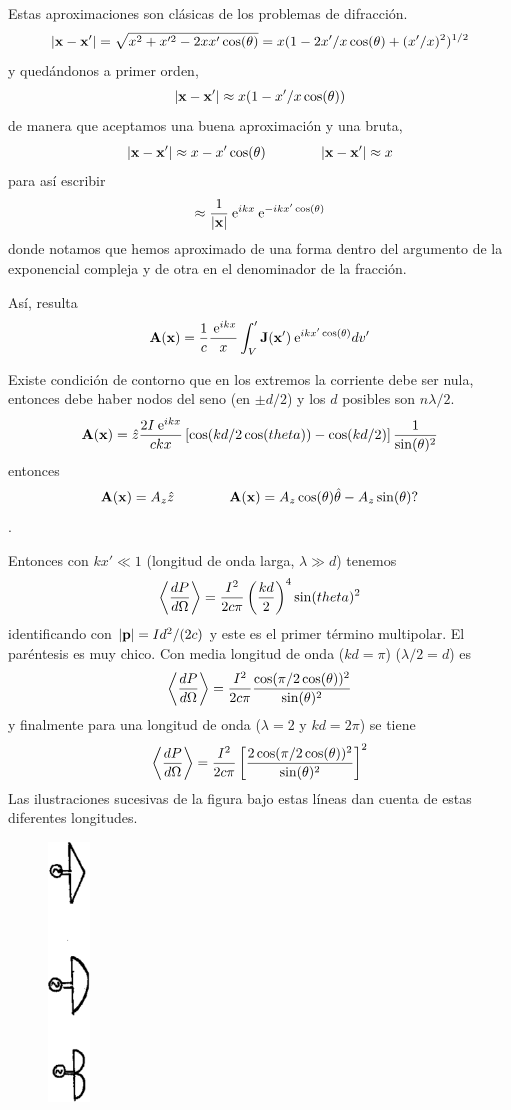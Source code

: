 \documentclass[10pt,oneside]{CBFT_book}
\begin{document}
Estas aproximaciones son clásicas de los problemas de difracción.
\[
	|\vb{x}-\vb{x}'| = \sqrt{ x^2 + x'^2 - 2xx'\cos(\theta)} =  
	x( 1 - 2x'/x \cos(\theta) + (x'/x)^2)^{1/2} 
\]
y quedándonos a primer orden,
\[
	|\vb{x}-\vb{x}'|\approx x (1 - x'/x \cos(\theta))
\]
de manera que aceptamos una buena aproximación y una bruta,
\[
	|\vb{x}-\vb{x}'| \approx x - x' \cos( \theta ) \qquad \qquad |\vb{x}-\vb{x}'| \approx x
\]
para así escribir
\[
	\approx \frac{1}{|\vb{x}|} \euler^{ikx} \euler^{-ikx'\cos(\theta)}
\]
donde notamos que hemos aproximado de una forma dentro del argumento de la exponencial compleja
y de otra en el denominador de la fracción.

Así, resulta
\[
	\vb{A}(\vb{x}) = \frac{1}{c} \frac{\euler^{ i k x} }{x} \int_V' \vb{J}(\vb{x}') 
		\euler^{ i k x' \cos(\theta) } dv'
\]

Existe condición de contorno que en los extremos la corriente debe ser nula, entonces debe haber nodos
del seno (en $\pm d/2$) y los $d$ posibles son $ n\lambda/2$.
\[
	\vb{A}(\vb{x}) = \hat{z} \frac{2I\euler^{ikx}}{ckx}\left[ \cos( kd/2 \cos(theta) )- 
		\cos( kd/2 ) \right]\frac{1}{\sin(\theta)^2}
\]
entonces 
\[
	\vb{A}(\vb{x}) = A_z \hat{z} \qquad \qquad \vb{A}(\vb{x}) =  A_z\cos(\theta)\hat{\theta} - 
		A_z\sin(\theta) ?
\]
.

Entonces con $ kx' \ll 1$ (longitud de onda larga, $\lambda \gg d $) tenemos
\[
	\left\langle\frac{d^{\hspace{-0.05em}} {P}}{d {\Omega}^{\hspace{-0.05em}}}\right\rangle = \frac{I^2}{2c\pi}\left( \frac{kd}{2} \right)^4 
		\sin(theta)^2
\]
identificando con $|\vb{p}| = Id^2/(2c)$ y este es el primer término multipolar. El paréntesis es muy
chico.
Con media longitud de onda ($kd=\pi$) ($\lambda/2=d$) es
\[
	\left\langle\frac{d^{\hspace{-0.05em}} {P}}{d {\Omega}^{\hspace{-0.05em}}}\right\rangle=\frac{I^2}{2c\pi}\frac{\cos(\pi/2 
	\cos(\theta))^2}{\sin(\theta)^2}
\]
y finalmente para una longitud de onda ($\lambda=2$ y $kd=2\pi$) se tiene 
\[
	\left\langle\frac{d^{\hspace{-0.05em}} {P}}{d {\Omega}^{\hspace{-0.05em}}}\right\rangle=\frac{I^2}{2c\pi} \left[ \frac{ 2\cos(\pi/2 
	\cos(\theta))^2}{\sin(\theta)^2} \right]^2
\]
Las ilustraciones sucesivas de la figura bajo estas líneas dan cuenta de estas diferentes longitudes.

\begin{figure}[htb]
	\begin{center}
	\includegraphics[width=0.1\textwidth]{images/fig_ft1_antena3.pdf}	 
	\end{center}
	\caption{}
\end{figure} 
\end{document}
